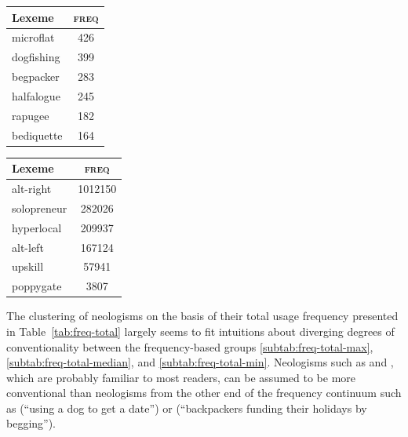 \documentclass[
  a4paper,
  abstract=on,
  captions=tableabove
  ]{scrartcl}
\begin{document}
\begin{table}
        \begin{subtable}{.4\linewidth}
          \label{subtab:freq-total-min}
          \centering
          \begin{tabular}{l S[table-format=3]}
            \toprule
            Lexeme     & {\textsc{freq}} \\
            \midrule
            microflat  & 426             \\
            dogfishing & 399             \\
            begpacker  & 283             \\
            halfalogue & 245             \\
            rapugee    & 182             \\
            bediquette & 164             \\
            \bottomrule
          \end{tabular}
        \end{subtable}
        \begin{subtable}{.4\linewidth}
          \label{subtab:freq-total-cases}
          \centering
          \begin{tabular}{l S[table-format=7]}
            \toprule
            Lexeme       & {\textsc{freq}}  \\
            \midrule
            alt-right    & 1012150 \\
            solopreneur  & 282026  \\
            hyperlocal   & 209937  \\
            alt-left     & 167124  \\
            upskill      & 57941   \\
            poppygate    & 3807    \\
            \bottomrule
          \end{tabular}
        \end{subtable}
      \end{table}

      The clustering of neologisms on the basis of their total usage frequency presented in Table~\ref{tab:freq-total} largely seems to fit intuitions about diverging degrees of conventionality between the frequency-based groups \ref{subtab:freq-total-max}, \ref{subtab:freq-total-median}, and \ref{subtab:freq-total-min}. Neologisms such as  and , which are probably familiar to most readers, can be assumed to be more conventional than neologisms from the other end of the frequency continuum such as  (\enquote{using a dog to get a date}) or  (\enquote{backpackers funding their holidays by begging}).
\end{document}
